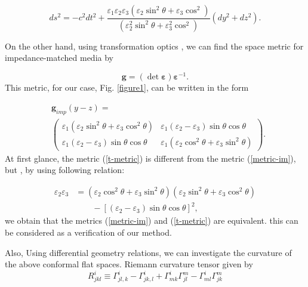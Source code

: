\documentclass[9pt,twocolumn,twoside]{osajnl}
\begin{document}
\begin{equation}\label{metric-im}
ds^{2}=- c^{2}dt^{2} + \dfrac{\varepsilon_{1}\varepsilon_{2}\varepsilon_{3}\left({\varepsilon_{2} \sin^{2}{\theta} + \varepsilon_{3}\cos^{2}}\right)}{\left({\varepsilon_{2}^{2} \sin^{2}{\theta} + \varepsilon_{3}^{2}\cos^{2}}\right)} {(dy^{2}+dz^{2})}.
\end{equation}

On the other hand, using  transformation optics \cite{leonhardt2012geometry},  we can find the space metric for impedance-matched media by 

\begin{equation}
\mathbf{g}=(\det{ \boldsymbol{\varepsilon}})\boldsymbol{\varepsilon}^{-1}.
\end{equation}
This metric, for our case, Fig. \ref{figure1}, can be written in the form 

\begin{align}\label{t-metric}
&\mathbf{g}_{imp}(y-z)= \nonumber\\
&\begin{pmatrix}
\varepsilon_{1}(\varepsilon_{2} \sin^{2}{\theta} +\varepsilon_{3}\cos^{2}{\theta})& \varepsilon_{1}(\varepsilon_{2}-\varepsilon_{3})\sin{\theta} \cos{\theta}\\
\varepsilon_{1}(\varepsilon_{2}-\varepsilon_{3})\sin{\theta} \cos{\theta}&\varepsilon_{1}(\varepsilon_{2} \cos^2{\theta} +\varepsilon_{3}\sin^{2}{\theta})
\end{pmatrix}.
\end{align}
At first glance, the metric (\ref{t-metric}) is different from the metric (\ref{metric-im}), but , by using following relation:  

\begin{equation}\label{dz}
\begin{split}
\varepsilon_{2} \varepsilon_{3}&=(\varepsilon_{2} \cos^2{\theta} +\varepsilon_{3}\sin^{2}{\theta})(\varepsilon_{2} \sin^{2}{\theta} +\varepsilon_{3}\cos^{2}{\theta})  \\
&   \qquad  -\left[ (\varepsilon_{2}-\varepsilon_{3})\sin{\theta} \cos{\theta}\right]^{2},
\end{split}
\end{equation}
 we obtain that the metrics (\ref{metric-im})  and (\ref{t-metric}) are equivalent.
 this can be considered as a verification of our method.
 
Also, Using differential geometry relations, we can investigate the curvature of the above conformal flat spaces. 
 Riemann curvature tensor given by \cite{leonhardt2012geometry}
\begin{equation}\label{Riemann}
R^{i}_{jkl}\equiv \Gamma^{i}_{jl,k}-\Gamma^{i}_{jk,l}+\Gamma^{i}_{mk}\Gamma^{m}_{jl}-\Gamma^{i}_{ml}\Gamma^{m}_{jk}
\end{equation}
\end{document}
